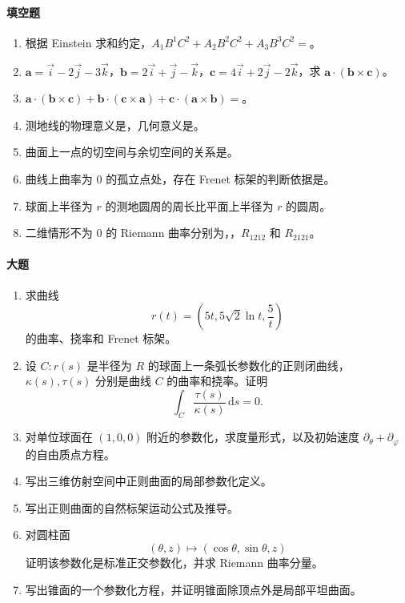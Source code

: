 \documentclass[UTF8,12pt,a4paper]{ctexart}
\newcommand{\dd}{\,\mathrm d}
\newcommand{\vct}[1]{\boldsymbol{#1}}
\begin{document}
\paragraph{填空题}
\begin{enumerate}
\item 根据 Einstein 求和约定，$A_1B^1C^2+A_2B^2C^2+A_3B^3C^2=$。
\item $\vct a=\vec i-2\vec j-3\vec k$，$\vct b=2\vec i+\vec j-\vec k$，$\vct c=4\vec i+2\vec j-2\vec k$，求 $\vct a\cdot(\vct b\times\vct c)$。
\item $\vct a\cdot(\vct b\times\vct c)+\vct b\cdot(\vct c\times\vct a)+\vct c\cdot(\vct a\times\vct b)=$。
\item 测地线的物理意义是\underline{\hspace{4cm}}，几何意义是\underline{\hspace{4cm}}。
\item 曲面上一点的切空间与余切空间的关系是\underline{\hspace{3cm}}。
\item 曲线上曲率为 $0$ 的孤立点处，存在 Frenet 标架的判断依据是\underline{\hspace{4cm}}。
\item 球面上半径为 $r$ 的测地圆周的周长比平面上半径为 $r$ 的圆周\underline{\hspace{2cm}}。
\item 二维情形不为 $0$ 的 Riemann 曲率分别为\underline{\hspace{2cm}}，\underline{\hspace{2cm}}，$R_{1212}$ 和 $R_{2121}$。
\end{enumerate}
\paragraph{大题}
\begin{enumerate}
\item 求曲线
\[
r(t)=\left(5t,5\sqrt2\ln t,\frac5t\right)
\]
的曲率、挠率和 Frenet 标架。
\item 设 $C:r(s)$ 是半径为 $R$ 的球面上一条弧长参数化的正则闭曲线，$\kappa(s),\tau(s)$ 分别是曲线 $C$ 的曲率和挠率。证明
\[
\int_C\frac{\tau(s)}{\kappa(s)}\dd s=0.
\]
\item 对单位球面在 $(1,0,0)$ 附近的参数化，求度量形式，以及初始速度 $\partial_\theta+\partial_\varphi$ 的自由质点方程。
\item 写出三维仿射空间中正则曲面的局部参数化定义。
\item 写出正则曲面的自然标架运动公式及推导。
\item 对圆柱面
\[
(\theta,z)\mapsto(\cos\theta,\sin\theta,z)
\]
证明该参数化是标准正交参数化，并求 Riemann 曲率分量。
\item 写出锥面的一个参数化方程，并证明锥面除顶点外是局部平坦曲面。
\end{enumerate}
\end{document}
